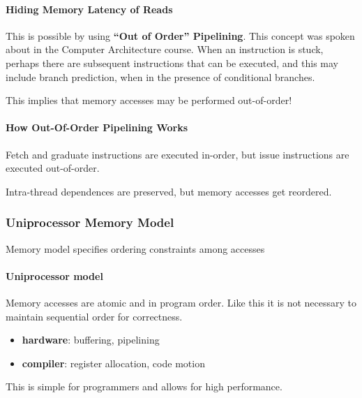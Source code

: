 \paragraph{Hiding Memory Latency of Reads} This is possible by using \textbf{\enquote{Out of Order} Pipelining}. This concept was spoken about in the Computer Architecture course. When an instruction is stuck, perhaps there are subsequent instructions that can be executed, and this may include branch prediction, when in the presence of conditional branches.
\par This implies that memory accesses may be performed out-of-order!
\paragraph{How Out-Of-Order Pipelining Works}
\par Fetch and graduate instructions are executed in-order, but issue instructions are executed out-of-order.
\par Intra-thread dependences are preserved, but memory accesses get reordered.
%
\clearpage
%
\subsubsection{Uniprocessor Memory Model}
\par Memory model specifies ordering constraints among accesses
\paragraph{Uniprocessor model} Memory accesses are atomic and in program order. Like this it is not necessary to maintain sequential order for correctness.
\begin{itemize}
    \item \textbf{hardware}: buffering, pipelining
    \item \textbf{compiler}: register allocation, code motion
\end{itemize}
\par This is simple for programmers and allows for high performance.\\
\begin{figure}
    \begin{minipage}{0.4\textwidth}
        \centering
    \end{minipage}
    \begin{minipage}{0.4\textwidth}
        \centering
    \end{minipage}
    \label{fig:unimem2}
\end{figure}
